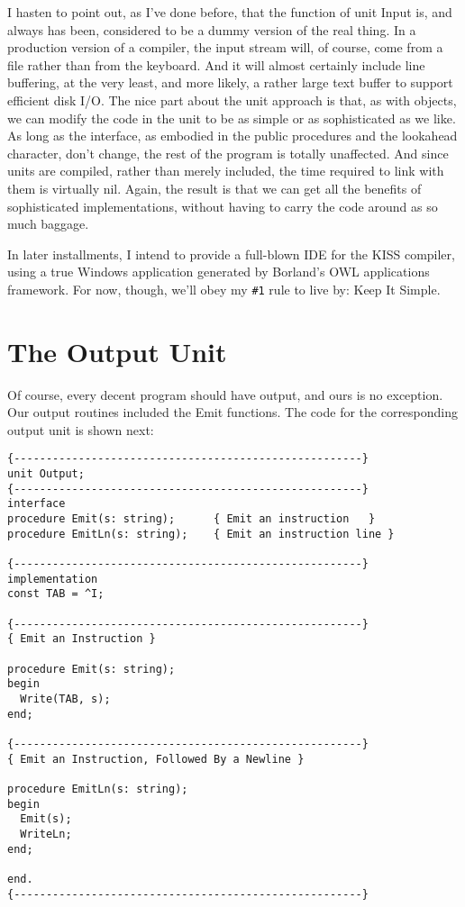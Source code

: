 I hasten to point out, as I've done before, that the function of unit Input is, and always has been, considered to be a dummy version of the real thing. In a production version of a compiler, the input stream will, of course, come from a file rather than from the keyboard. And it will almost certainly include line buffering, at the very least, and more likely, a rather large text buffer to support efficient disk I/O. The nice part about the unit approach is that, as with objects, we can modify the code in the unit to be as simple or as sophisticated as we like. As long as the interface, as embodied in the public procedures and the lookahead character, don't change, the rest of the program is totally unaffected. And since units are compiled, rather than merely included, the time required to link with them is virtually nil. Again, the result is that we can get all the benefits of sophisticated implementations, without having to carry the code around as so much baggage.

In later installments, I intend to provide a full-blown IDE for the KISS compiler, using a true Windows application generated by Borland's OWL applications framework. For now, though, we'll obey my \verb|#1| rule to live by:  Keep It Simple.

\section{The Output Unit}

Of course, every decent program should have output, and ours is no exception. Our output routines included the Emit functions. The code for the corresponding output unit is shown next:

\begin{verbatim}
{------------------------------------------------------}
unit Output;
{------------------------------------------------------}
interface
procedure Emit(s: string);      { Emit an instruction   }
procedure EmitLn(s: string);    { Emit an instruction line }

{------------------------------------------------------}
implementation
const TAB = ^I;

{------------------------------------------------------}
{ Emit an Instruction }

procedure Emit(s: string);
begin
  Write(TAB, s);
end;

{------------------------------------------------------}
{ Emit an Instruction, Followed By a Newline }

procedure EmitLn(s: string);
begin
  Emit(s);
  WriteLn;
end;

end.
{------------------------------------------------------}
\end{verbatim}

